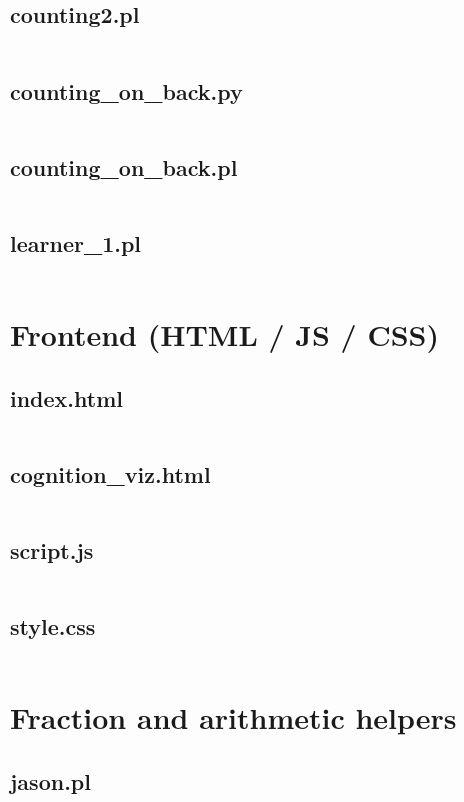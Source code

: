 \documentclass{article}
\begin{document}
\subsection{counting2.pl}
\inputminted{prolog}{counting2.pl}
\subsection{counting\_on\_back.py}
\inputminted{python}{counting_on_back.py}
\subsection{counting\_on\_back.pl}
\inputminted{prolog}{counting_on_back.pl}
\subsection{learner\_1.pl}
\inputminted{prolog}{learner_1.pl}

\section{Frontend (HTML / JS / CSS)}
\subsection{index.html}
\inputminted{html}{index.html}
\subsection{cognition\_viz.html}
\inputminted{html}{cognition_viz.html}
\subsection{script.js}
\inputminted{javascript}{script.js}
\subsection{style.css}
\inputminted{css}{style.css}

\section{Fraction and arithmetic helpers}
\subsection{jason.pl}
\inputminted{prolog}{jason.pl}
\end{document}
